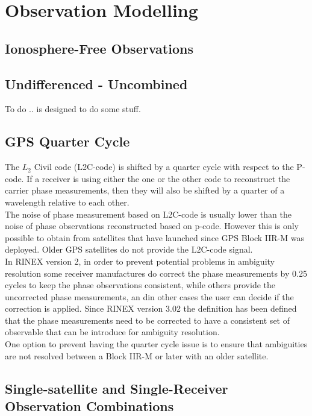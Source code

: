 \chapter{Observation Modelling}
\label{ch:observation_modelling}

\section{Ionosphere-Free Observations}

\section{Undifferenced - Uncombined}
To do ..
 is designed to do some stuff.

\section{GPS Quarter Cycle}
The $L_2$ Civil code (L2C-code) is shifted by a quarter cycle with respect to the P-code. If a receiver is using either the one or the other code to reconstruct the carrier phase measurements, then they will also be shifted by a quarter of a wavelength relative to each other.\\
The noise of phase measurement based on L2C-code is usually lower than the noise of phase observations reconstructed based on p-code. However this is only possible to obtain from satellites that have launched since GPS Block IIR-M was deployed. Older GPS satellites do not provide the L2C-code signal.\\
In RINEX version 2, in order to prevent potential problems in ambiguity resolution some receiver manufactures do correct the phase measurements by 0.25 cycles to keep the phase observations consistent, while others provide the uncorrected phase measurements, an din other cases the user can decide if the correction is applied. Since RINEX version 3.02 the definition has been defined that the phase measurements need to be corrected to have a consistent set of observable that can be introduce for ambiguity resolution.\\
One option to prevent having the quarter cycle issue is to ensure that ambiguities are not resolved between a Block IIR-M or later  with an older satellite.

\section{Single-satellite and Single-Receiver Observation Combinations}

